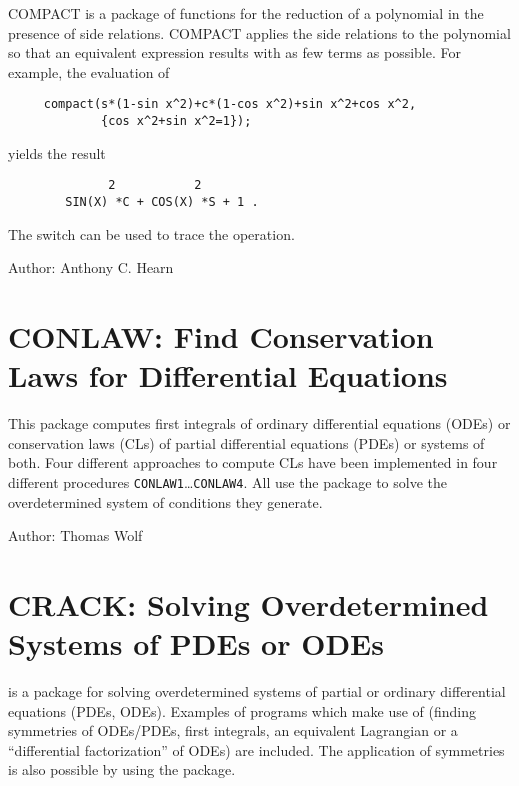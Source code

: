 COMPACT is a package of functions for the reduction of a polynomial in the
presence of side relations.  COMPACT applies the side relations to the
polynomial so that an equivalent expression results with as few terms as
possible.  For example, the evaluation of
\begin{verbatim}
     compact(s*(1-sin x^2)+c*(1-cos x^2)+sin x^2+cos x^2,
             {cos x^2+sin x^2=1});
\end{verbatim}
yields the result\pagebreak[1]
\begin{verbatim}
              2           2
        SIN(X) *C + COS(X) *S + 1 .
\end{verbatim}
The switch  can be used to trace the operation.

Author: Anthony C. Hearn
\fi

\section{CONLAW: Find Conservation Laws for Differential Equations}

This package computes first integrals of ordinary differential
equations (ODEs) or conservation laws (CLs) of partial differential
equations (PDEs) or systems of both.  Four different approaches to
compute CLs have been implemented in four different procedures
\texttt{CONLAW1}\ldots \texttt{CONLAW4}.  All use the package
\hyperref[package:CRACK]{} to solve the overdetermined
system of conditions they generate.

Author: Thomas Wolf



\newpage

\section{CRACK: Solving Overdetermined Systems of PDEs or ODEs}
\label{package:CRACK}

 is a package for solving overdetermined systems of
partial or ordinary differential equations (PDEs, ODEs).  Examples of
programs which make use of  (finding symmetries of
ODEs/PDEs, first integrals, an equivalent Lagrangian or a
``differential factorization'' of ODEs) are included.  The application
of symmetries is also possible by using the
\hyperref[package:APPLYSYM]{} package.

